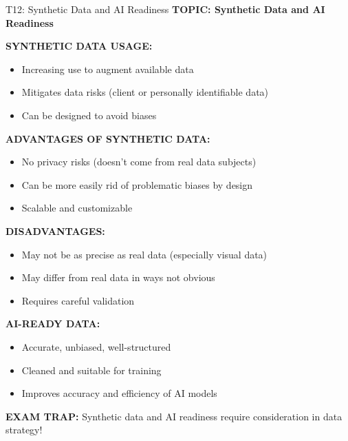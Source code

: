 \documentclass[8pt]{beamer}
\begin{document}
	\begin{frame}{T12: Synthetic Data and AI Readiness}
		\fontsize{6.5}{7.5}\selectfont
		\textbf{TOPIC: Synthetic Data and AI Readiness}
		
		\vspace{0.1cm}
		\textbf{SYNTHETIC DATA USAGE:}
		\begin{itemize}
			\item Increasing use to augment available data
			\item Mitigates data risks (client or personally identifiable data)
			\item Can be designed to avoid biases
		\end{itemize}
		
		\vspace{0.1cm}
		\textbf{ADVANTAGES OF SYNTHETIC DATA:}
		\begin{itemize}
			\item No privacy risks (doesn't come from real data subjects)
			\item Can be more easily rid of problematic biases by design
			\item Scalable and customizable
		\end{itemize}
		
		\vspace{0.1cm}
		\textbf{DISADVANTAGES:}
		\begin{itemize}
			\item May not be as precise as real data (especially visual data)
			\item May differ from real data in ways not obvious
			\item Requires careful validation
		\end{itemize}
		
		\vspace{0.1cm}
		\textbf{AI-READY DATA:}
		\begin{itemize}
			\item Accurate, unbiased, well-structured
			\item Cleaned and suitable for training
			\item Improves accuracy and efficiency of AI models
		\end{itemize}
		
		\textcolor{myred}{\textbf{EXAM TRAP:}} Synthetic data and AI readiness \textcolor{myblue}{require consideration in data strategy}!
	\end{frame}
	
\end{document}

